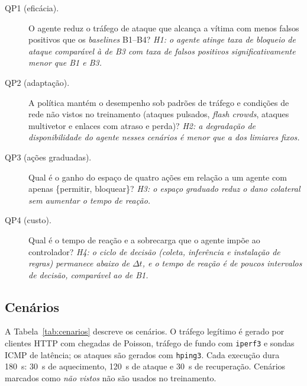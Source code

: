 \documentclass[12pt]{article}
\begin{document}
\begin{description}
  \item[QP1 (eficácia).] O agente reduz o tráfego de ataque que alcança a
        vítima com menos falsos positivos que os \textit{baselines} B1--B4?
        \textit{H1: o agente atinge taxa de bloqueio de ataque comparável à de
        B3 com taxa de falsos positivos significativamente menor que B1 e B3.}
  \item[QP2 (adaptação).] A política mantém o desempenho sob padrões de
        tráfego e condições de rede não vistos no treinamento (ataques
        pulsados, \textit{flash crowds}, ataques multivetor e enlaces com
        atraso e perda)? \textit{H2: a degradação de disponibilidade do agente
        nesses cenários é menor que a dos limiares fixos.}
  \item[QP3 (ações graduadas).] Qual é o ganho do espaço de quatro ações em
        relação a um agente com apenas \{permitir, bloquear\}?
        \textit{H3: o espaço graduado reduz o dano colateral sem aumentar o
        tempo de reação.}
  \item[QP4 (custo).] Qual é o tempo de reação e a sobrecarga que o agente
        impõe ao controlador? \textit{H4: o ciclo de decisão (coleta,
        inferência e instalação de regras) permanece abaixo de $\Delta t$, e o
        tempo de reação é de poucos intervalos de decisão, comparável ao de
        B1.}
\end{description}

\subsection{Cenários}

A Tabela~\ref{tab:cenarios} descreve os cenários. O tráfego legítimo é gerado
por clientes HTTP com chegadas de Poisson, tráfego de fundo com
\texttt{iperf3} e sondas ICMP de latência; os ataques são gerados com
\texttt{hping3}. Cada execução dura 180~s: 30~s de aquecimento, 120~s de
ataque e 30~s de recuperação. Cenários marcados como \textit{não vistos} não
são usados no treinamento.
\end{document}
